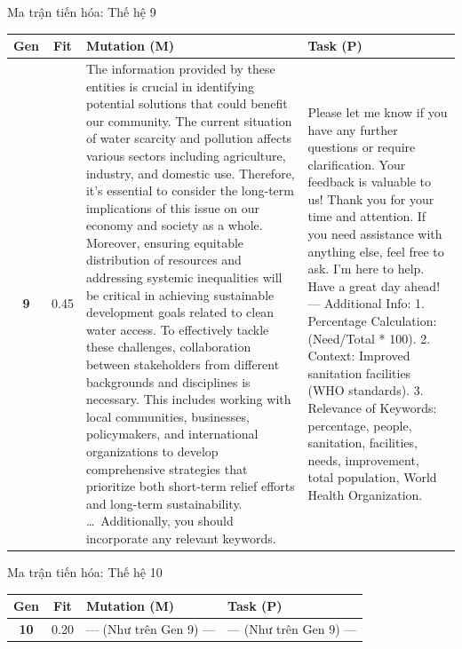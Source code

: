 \documentclass[english,main=vietnamese,xcolor=table]{beamer}
\begin{document}
\begin{frame}{Ma trận tiến hóa: Thế hệ 9}
\tiny
\centering
\renewcommand{\arraystretch}{1.4}
\begin{tabular}{|c|c|p{4.7cm}|p{5.1cm}|}
\hline
\rowcolor{blue!20} \textbf{Gen} & \textbf{Fit} & \textbf{Mutation (M)} & \textbf{Task (P)} \\ \hline
\textbf{9} & 0.45 & The information provided by these entities is crucial in identifying potential solutions that could benefit our community. The current situation of water scarcity and pollution affects various sectors including agriculture, industry, and domestic use. Therefore, it's essential to consider the long-term implications of this issue on our economy and society as a whole. Moreover, ensuring equitable distribution of resources and addressing systemic inequalities will be critical in achieving sustainable development goals related to clean water access. To effectively tackle these challenges, collaboration between stakeholders from different backgrounds and disciplines is necessary. This includes working with local communities, businesses, policymakers, and international organizations to develop comprehensive strategies that prioritize both short-term relief efforts and long-term sustainability. \ldots\ Additionally, you should incorporate any relevant keywords. & Please let me know if you have any further questions or require clarification. Your feedback is valuable to us! Thank you for your time and attention. If you need assistance with anything else, feel free to ask. I'm here to help. Have a great day ahead! --- Additional Info: 1. Percentage Calculation: (Need/Total * 100). 2. Context: Improved sanitation facilities (WHO standards). 3. Relevance of Keywords: percentage, people, sanitation, facilities, needs, improvement, total population, World Health Organization. \\ \hline
\end{tabular}
\end{frame}

\begin{frame}{Ma trận tiến hóa: Thế hệ 10}
\tiny
\centering
\renewcommand{\arraystretch}{1.4}
\begin{tabular}{|c|c|p{4.7cm}|p{5.1cm}|}
\hline
\rowcolor{blue!20} \textbf{Gen} & \textbf{Fit} & \textbf{Mutation (M)} & \textbf{Task (P)} \\ \hline
\textbf{10} & 0.20 & --- (Như trên Gen 9) --- & --- (Như trên Gen 9) --- \\ \hline
\end{tabular}
\end{frame}
\end{document}
